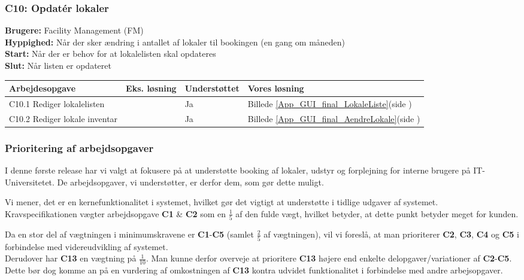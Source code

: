 \subsubsection{C10: Opdatér lokaler}
\textbf{Brugere:} Facility Management (FM)\\
\textbf{Hyppighed:} Når der sker ændring i antallet af lokaler til bookingen (en gang om måneden)\\
\textbf{Start:} Når der er behov for at lokalelisten skal opdateres\\
\textbf{Slut:} Når listen er opdateret

\begin{tabular}{ | p{7.5cm} | p{2.5cm} | p{2.2cm} | p{3.3cm} |}
\hline
\textbf{Arbejdesopgave} & \textbf{Eks. løsning} & \textbf{Understøttet}  & \textbf{Vores løsning}\\ 
\hline
C10.1 Rediger lokalelisten & & Ja & Billede \ref{App_GUI_final_LokaleListe}(side \pageref{App_GUI_final_LokaleListe}) \\ 
\hline
C10.2 Rediger lokale inventar & & Ja & Billede \ref{App_GUI_final_AendreLokale}(side \pageref{App_GUI_final_AendreLokale}) \\ 
\hline
\end{tabular}

\subsubsection{Prioritering af arbejdsopgaver}
\label{Evaluation_workareas_priorities}
I denne første release har vi valgt at fokusere på at understøtte booking af lokaler, udstyr og forplejning for interne brugere på IT-Universitetet. De arbejdsopgaver, vi understøtter, er derfor dem, som gør dette muligt.

Vi mener, det er en kernefunktionalitet i systemet, hvilket gør det vigtigt at understøtte i tidlige udgaver af systemet. \\Kravspecifikationen vægter arbejdsopgave \textbf{C1} \& \textbf{C2} som en $\frac{1}{5}$ af den fulde vægt, hvilket betyder, at dette punkt betyder meget for kunden\cite[s. 8]{kravspec}.

Da en stor del af vægtningen i minimumskravene er \textbf{C1}-\textbf{C5} (samlet $\frac{2}{5}$ af vægtningen), vil vi foreslå, at man prioriterer \textbf{C2}, \textbf{C3}, \textbf{C4} og \textbf{C5} i forbindelse med videreudvikling af systemet.
\\Derudover har \textbf{C13} en vægtning på $\frac{1}{10}$.  Man kunne derfor overveje at prioritere \textbf{C13} højere end enkelte delopgaver/variationer af \textbf{C2}-\textbf{C5}. Dette bør dog komme an på en vurdering af omkostningen af \textbf{C13} kontra udvidet funktionalitet i forbindelse med andre arbejsopgaver.

